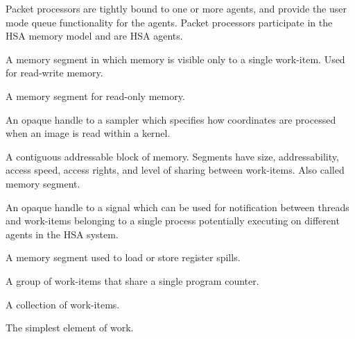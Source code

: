 \documentclass[oneside]{book}
\begin{document}
\begin{description}[itemsep=5pt,leftmargin=0cm, labelindent=0cm]
\item[Packet processor] Packet processors are tightly bound to one or more
  agents, and provide the user mode queue functionality for the agents. Packet
  processors participate in the HSA memory model and are HSA agents.

\item[Private segment] A memory segment in which memory is visible only to a
  single work-item. Used for read-write memory.

\item[Readonly segment] A memory segment for read-only memory.

\item[Sampler handle] An opaque handle to a sampler which specifies how
  coordinates are processed when an image is read within a kernel.

\item[Segment] A contiguous addressable block of memory. Segments have size,
  addressability, access speed, access rights, and level of sharing between
  work-items. Also called memory segment.

\item[Signal (handle)] An opaque handle to a signal which can be used for
  notification between threads and work-items belonging to a single process
  potentially executing on different agents in the HSA system.

\item[Spill segment] A memory segment used to load or store register spills.

\item[Wavefront] A group of work-items that share a single program counter.

\item[Work-group] A collection of work-items.

\item[Work-item] The simplest element of work.

\end{description}

\newpage
{}
\printindex[api]
\printindex[ext]


\begin{thebibliography}{30}



\end{thebibliography}
\end{document}
